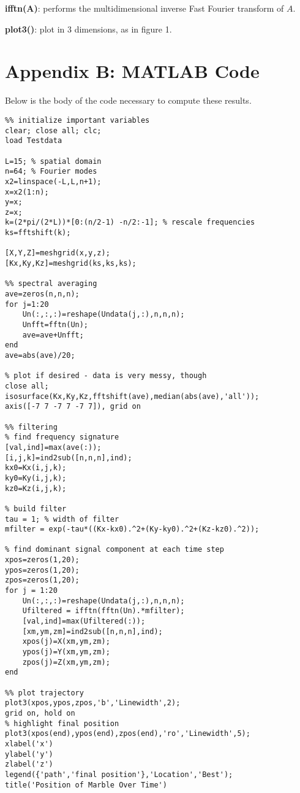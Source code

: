 \documentclass[a4paper,12 pt]{article}
\begin{document}
\textbf{ifftn(A)}: performs the multidimensional inverse Fast Fourier transform of $A$.

\textbf{plot3()}: plot in 3 dimensions, as in figure 1.

\section{Appendix B: MATLAB Code}
Below is the body of the code necessary to compute these results.
\begin{lstlisting}
%% initialize important variables
clear; close all; clc;
load Testdata

L=15; % spatial domain
n=64; % Fourier modes
x2=linspace(-L,L,n+1);
x=x2(1:n);
y=x;
z=x;
k=(2*pi/(2*L))*[0:(n/2-1) -n/2:-1]; % rescale frequencies
ks=fftshift(k);

[X,Y,Z]=meshgrid(x,y,z);
[Kx,Ky,Kz]=meshgrid(ks,ks,ks);

%% spectral averaging
ave=zeros(n,n,n);
for j=1:20
    Un(:,:,:)=reshape(Undata(j,:),n,n,n);
    Unfft=fftn(Un);
    ave=ave+Unfft;
end
ave=abs(ave)/20;

% plot if desired - data is very messy, though
close all;
isosurface(Kx,Ky,Kz,fftshift(ave),median(abs(ave),'all'));
axis([-7 7 -7 7 -7 7]), grid on

%% filtering
% find frequency signature
[val,ind]=max(ave(:));
[i,j,k]=ind2sub([n,n,n],ind);
kx0=Kx(i,j,k);
ky0=Ky(i,j,k);
kz0=Kz(i,j,k);

% build filter
tau = 1; % width of filter
mfilter = exp(-tau*((Kx-kx0).^2+(Ky-ky0).^2+(Kz-kz0).^2));

% find dominant signal component at each time step
xpos=zeros(1,20);
ypos=zeros(1,20);
zpos=zeros(1,20);
for j = 1:20
    Un(:,:,:)=reshape(Undata(j,:),n,n,n);
    Ufiltered = ifftn(fftn(Un).*mfilter);
    [val,ind]=max(Ufiltered(:)); 
    [xm,ym,zm]=ind2sub([n,n,n],ind);
    xpos(j)=X(xm,ym,zm); 
    ypos(j)=Y(xm,ym,zm);
    zpos(j)=Z(xm,ym,zm);
end

%% plot trajectory
plot3(xpos,ypos,zpos,'b','Linewidth',2);
grid on, hold on
% highlight final position
plot3(xpos(end),ypos(end),zpos(end),'ro','Linewidth',5);
xlabel('x')
ylabel('y')
zlabel('z')
legend({'path','final position'},'Location','Best');
title('Position of Marble Over Time')
\end{lstlisting}
\end{document}
